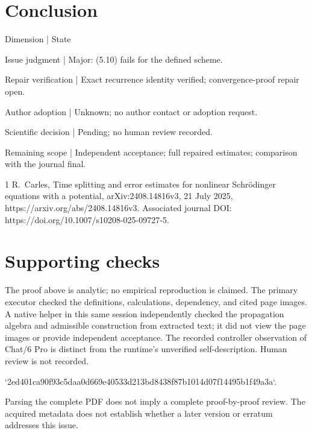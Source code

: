 \documentclass[10pt]{article}
\begin{document}
\section*{Conclusion}
Dimension | State\par
Issue judgment | Major: (5.10) fails for the defined scheme.\par
Repair verification | Exact recurrence identity verified; convergence-proof repair open.\par
Author adoption | Unknown; no author contact or adoption request.\par
Scientific decision | Pending; no human review recorded.\par
Remaining scope | Independent acceptance; full repaired estimates; comparison with the journal final.\par
1 R. Carles, Time splitting and error estimates for nonlinear Schrödinger equations with a potential, arXiv:2408.14816v3, 21 July 2025, https://arxiv.org/abs/2408.14816v3. Associated journal DOI: https://doi.org/10.1007/s10208-025-09727-5.\par
\section*{Supporting checks}
The proof above is analytic; no empirical reproduction is claimed. The primary executor checked the definitions, calculations, dependency, and cited page images. A native helper in this same session independently checked the propagation algebra and admissible construction from extracted text; it did not view the page images or provide independent acceptance. The recorded controller observation of Chat/6 Pro is distinct from the runtime’s unverified self-description. Human review is not recorded.\par
`2ed401ca90f93c5daa0d669e40533d213bd8438f87b1014d07f14495b1f49a3a`.\par
Parsing the complete PDF does not imply a complete proof-by-proof review. The acquired metadata does not establish whether a later version or erratum addresses this issue.\par
\end{document}
